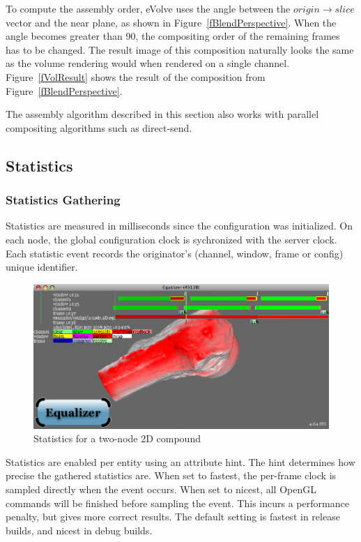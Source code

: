\documentclass[10pt,a4]{scrartcl}
\newcommand{\fig}[1]{Figure~\ref{#1}}
\begin{document}
To compute the assembly order, \textsf{eVolve} uses the angle between
the $origin \rightarrow slice$ vector and the near plane, as shown in
\fig{fBlendPerspective}. When the angle becomes greater than
90\textdegree, the compositing order of the remaining frames has to be
changed. The result image of this composition naturally looks the same
as the volume rendering would when rendered on a single
channel. \fig{fVolResult} shows the result of the composition from
\fig{fBlendPerspective}.

The assembly algorithm described in this section also works with parallel
compositing algorithms such as direct-send. 


\subsection{\label{sStatistics}Statistics}

\subsubsection{Statistics Gathering}

Statistics are measured in milliseconds since the configuration was
initialized. On each node, the global configuration clock is sychronized
with the server clock. Each statistic event records the originator's
(channel, window, frame or config) unique identifier.

\begin{figure}
  \includegraphics[width=.618\textwidth]{images/statistics}
  {\caption{\label{fStatistics}Statistics for a two-node 2D compound}}
\end{figure}
Statistics are enabled per entity using an attribute hint. The hint
determines how precise the gathered statistics are. When set to
\textsf{fastest}, the per-frame clock is sampled directly when the event
occurs. When set to \textsf{nicest}, all OpenGL commands will be
finished before sampling the event. This incurs a performance penalty,
but gives more correct results. The default setting is fastest in
release builds, and nicest in debug builds.
\end{document}
